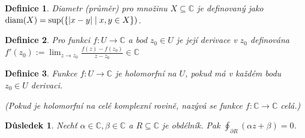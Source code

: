 \documentclass[10pt,a4paper]{article}
\newcommand{\Cc}{{\mathbb{C}}}      %
\newcommand{\diam}{\normalfont{\text{diam}}}   	%
\newtheorem{Def}{Definice}[section]
\newtheorem{cons}{Důsledek}[section]
\begin{document}
\begin{Def} Diametr (průměr) \normalfont pro množinu $X \subseteq \Cc$ je definovaný jako $ \diam(X) = \sup(\{|x-y| \mid x,y \in X\})$.
\end{Def}

\begin{Def} \normalfont Pro funkci $f: U \to \Cc$ a bod $z_0 \in U$ je její \textit{derivace} v $ z_0 $ definována $\displaystyle f'(z_0):=\lim_{z\to z_0}\frac{f(z) - f(z_0)}{z-z_0} \in \Cc$
\end{Def}
\begin{Def} \normalfont Funkce $f: U\to \Cc$ je \textit{holomorfní} na $ U $, pokud má v každém bodu $ z_0 \in U $ derivaci.
	
	(Pokud je holomorfní na celé komplexní rovině, nazývá se funkce $f: \Cc \to \Cc$ \textit{celá}.)
\end{Def}


\begin{cons} Nechť $\alpha \in \Cc, \beta \in \Cc$ a $R \subseteq \Cc$ je obdélník. Pak $\displaystyle \oint_{\partial R}(\alpha z + \beta ) = 0$.
\end{cons}
\end{document}
